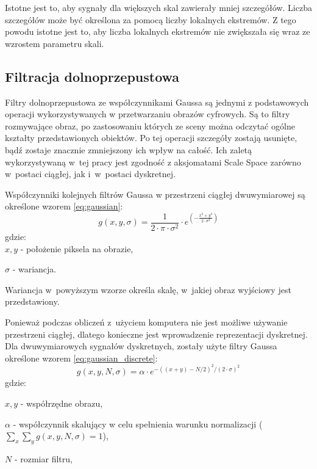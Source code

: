 Istotne jest to, aby sygnały dla większych skal zawierały mniej szczegółów. Liczba szczegółów może być określona za pomocą liczby lokalnych ekstremów. Z tego powodu istotne jest to, aby liczba lokalnych ekstremów nie zwiększała się wraz ze wzrostem parametru skali.

\subsection{Filtracja dolnoprzepustowa}
\label{subsec:filtracjaGaussa}
Filtry dolnoprzepustowa ze współczynnikami Gaussa są jednymi z podstawowych operacji wykorzystywanych w przetwarzaniu obrazów cyfrowych. Są to filtry rozmywające obraz, po zastosowaniu których ze sceny można odczytać ogólne kształty przedstawionych obiektów. Po tej operacji szczegóły zostają usunięte, bądź zostaje znacznie zmniejszony ich wpływ na całość. Ich zaletą wykorzystywaną w~tej pracy jest zgodność z aksjomatami Scale Space zarówno w~postaci ciągłej, jak i~w~postaci dyskretnej.

Współczynniki kolejnych filtrów Gaussa w przestrzeni ciągłej dwuwymiarowej są określone wzorem \eqref{eq:gaussian}:
\begin{equation}
\label{eq:gaussian}
g(x,y,\sigma)=\frac{1}{2 \cdot \pi \cdot \sigma^ {2} }\cdot e^{(-\frac{x^{2} + y^{2}}{2 \cdot \sigma ^{2}})}
\end{equation}
gdzie:\\

$ x,y $ - położenie piksela na obrazie,

$ \sigma $ - wariancja.

Wariancja w~powyższym wzorze określa skalę, w~jakiej obraz wyjściowy jest przedstawiony. 

Ponieważ podczas obliczeń z~użyciem komputera nie jest możliwe używanie przestrzeni ciągłej, dlatego konieczne jest wprowadzenie reprezentacji dyskretnej. 
Dla dwuwymiarowych sygnałów dyskretnych, zostały użyte filtry Gaussa określone wzorem \eqref{eq:gaussian_discrete}:
\begin{equation}
\label{eq:gaussian_discrete}
g(x,y,N,\sigma) = \alpha \cdot e^{-((x+y)-N/2)^2/(2 \cdot \sigma)^2}
\end{equation}
gdzie:

$ x, y$ - współrzędne obrazu,

$ \alpha $ - współczynnik skalujący w celu spełnienia warunku normalizacji ($ \sum_x \sum_y g(x,y,N,\sigma) = 1 $),

$ N $ - rozmiar filtru,

